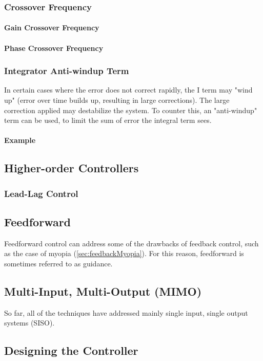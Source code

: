 \documentclass[../notes.tex]{subfiles}
\begin{document}
\subsubsection{Crossover Frequency}
\paragraph{Gain Crossover Frequency}
\paragraph{Phase Crossover Frequency}



\subsubsection{Integrator Anti-windup Term}
In certain cases where the error does not correct rapidly, the I term may "wind up" (error over time builds up, resulting in large corrections). The large correction applied may destabilize the system. To counter this, an "anti-windup" term can be used, to limit the sum of error the integral term sees.
\paragraph{Example}

\subsection{Higher-order Controllers}
\subsubsection{Lead-Lag Control}
\subsection{Feedforward}
Feedforward control can address some of the drawbacks of feedback control, such as the case of myopia (\underline{\ref{sec:feedbackMyopia}}). For this reason, feedforward is sometimes referred to as guidance.

\subsection{Multi-Input, Multi-Output (MIMO)}
So far, all of the techniques have addressed mainly single input, single output systems (SISO).

\subsection{Designing the Controller}
\end{document}
